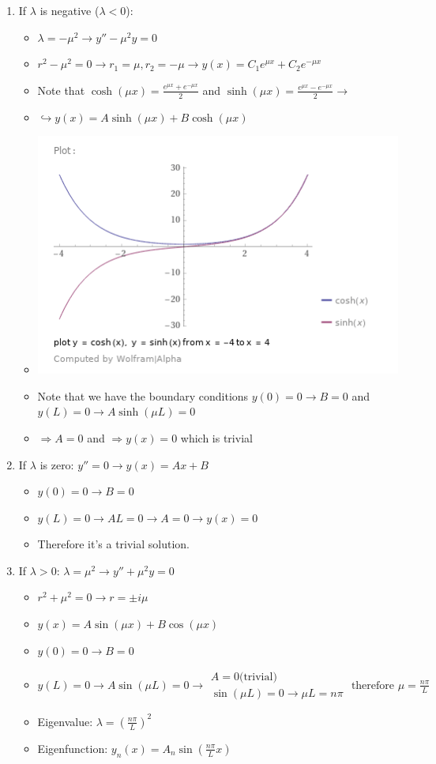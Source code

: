 \documentclass{article}
\begin{document}
\begin{enumerate}
    \item If $\lambda$ is negative ($\lambda < 0 $): 
    \begin{itemize}
        \item $\lambda = -\mu^2 \to y'' - \mu^2 y = 0$
        \item $r^2 - \mu^2 = 0 \to r_1 = \mu, r_2 = -\mu \longrightarrow y(x) = C_1 e^{\mu x} + C_2 e^{-\mu x}$
        \item Note that $\cosh(\mu x) = \frac{e^{\mu x} + e^{-\mu x}}{2} $ and $\sinh(\mu x) = \frac{e^{\mu x} - e^{-\mu x}}{2} \longrightarrow$
        \item $\hookrightarrow y(x) = A \sinh(\mu x) + B \cosh(\mu x)$
        \item \includegraphics[width = 0.6 \textwidth]{image8.png}
        \item Note that we have the boundary conditions $y(0) = 0 \to B = 0$ and $y(L) = 0 \to A\sinh(\mu L) = 0$
        \item $\Rightarrow A = 0$ and $\Rightarrow y(x) = 0$ which is trivial
    \end{itemize}
    \item If $\lambda$ is zero: $y'' = 0 \longrightarrow y(x) = Ax + B$
    \begin{itemize}
        \item $y(0) = 0 \longrightarrow B = 0$
        \item $y(L) = 0 \longrightarrow AL = 0 \to A = 0 \to y(x) = 0$
        \item Therefore it's a trivial solution. 
    \end{itemize}
    \item If $\lambda > 0$: $\lambda = \mu^2 \to y'' + \mu^2 y = 0$
    \begin{itemize}
        \item $r^2 + \mu^2 = 0 \longrightarrow r = \pm i \mu$
        \item $y(x) = A \sin(\mu x) + B \cos(\mu x)$
        \item $y(0) = 0 \to B = 0$
        \item $y(L) = 0 \to A \sin(\mu L) = 0 \to \begin{matrix} A = 0 \text{(trivial)} \\ \sin(\mu L) = 0 \to \mu L = n \pi  \end{matrix} \text{ therefore } \mu = \frac{n \pi}{L}$
        \item Eigenvalue: $\lambda = \left(\frac{n \pi}{L} \right)^2$
        \item Eigenfunction: $y_n(x) = A_n \sin(\frac{n \pi}{L} x)$
    \end{itemize}
\end{enumerate}
\end{document}
